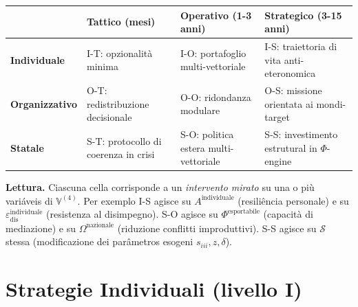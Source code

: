 {\def\LTcaptype{none} %
{\small\begin{longtable}[]{@{}
  >{\raggedright\arraybackslash}p{}
  >{\raggedright\arraybackslash}p{}
  >{\raggedright\arraybackslash}p{}
  >{\raggedright\arraybackslash}p{}@{}}
\toprule\noalign{}
\begin{minipage}[b]{\linewidth}\raggedright
\end{minipage} & \begin{minipage}[b]{\linewidth}\raggedright
\textbf{Tattico} (mesi)
\end{minipage} & \begin{minipage}[b]{\linewidth}\raggedright
\textbf{Operativo} (1-3 anni)
\end{minipage} & \begin{minipage}[b]{\linewidth}\raggedright
\textbf{Strategico} (3-15 anni)
\end{minipage} \\
\midrule\noalign{}
\endhead
\bottomrule\noalign{}
\endlastfoot
\textbf{Individuale} & I-T: opzionalità minima & I-O: portafoglio
multi-vettoriale & I-S: traiettoria di vita anti-eteronomica \\
\textbf{Organizzativo} & O-T: redistribuzione decisionale & O-O:
ridondanza modulare & O-S: missione orientata ai mondi-target \\
\textbf{Statale} & S-T: protocollo di coerenza in crisi & S-O: politica
estera multi-vettoriale & S-S: investimento estrutural in
\(\Phi\)-engine \\
\end{longtable}}
}

\Proved{} \textbf{Lettura.} Ciascuna cella corrisponde a un
\emph{intervento mirato} su una o più variáveis di \(\mathbb{V}^{(4)}\).
Per exemplo I-S agisce su \(A^{\text{individuale}}\) (resiliência
personale) e su \(\varepsilon_{\text{dis}}^{\text{individuale}}\)
(resistenza al disimpegno). S-O agisce su \(\Phi^{\text{esportabile}}\)
(capacità di mediazione) e su \(\Omega^{\text{nazionale}}\) (riduzione
conflitti improduttivi). S-S agisce su \(\mathcal{S}\) stessa
(modificazione dei parâmetros esogeni \(s_{iii}, z, \delta\)).



\section{Strategie Individuali (livello
I)}\label{strategie-individuali-livello-i}

